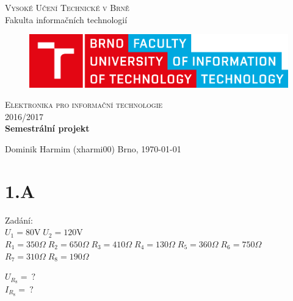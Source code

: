 \documentclass[12pt,a4paper]{article}
\begin{document}

	\begin{titlepage}
		\begin{center}
			\textsc{\LARGE Vysoké Učení Technické v Brně} \\[0.5cm]
			{\LARGE Fakulta informačních technologií}

			\begin{figure}[H]
				\center\includegraphics[width=0.5\linewidth]{obr/logo.pdf}
			\end{figure}

			\vspace{3cm}

			\textsc{\LARGE Elektronika pro informační technologie} \\[0.5cm]
			\textsc{\LARGE 2016/2017} \\[3.5cm]

			\textbf{{\LARGE Semestrální projekt}}
		\end{center}
		\vfill
		\begin{flushleft} 
			\large
			Dominik Harmim (xharmi00)
			\hfill
			Brno, \today
		\end{flushleft}
	\end{titlepage}


	\section*{1.A}

	{\Large Zadání:} \\
	$U_1 = 80 \text{V} \; U_2=120 \text{V}$ \\
	$R_1 = 350 \Omega \; R_2 = 650 \Omega \; R_3 = 410 \Omega \;
	R_4 = 130 \Omega \; R_5 = 360 \Omega \; R_6 =750 \Omega$ \\
	$R_7 = 310 \Omega \; R_8 = 190 \Omega$

	$U_{R_8} = \: \text{?}$ \\
	$I_{R_8} = \: \text{?}$ \\
\end{document}
